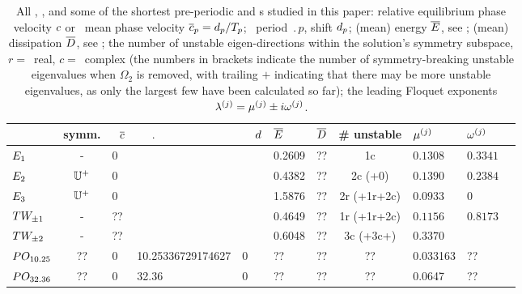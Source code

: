 \documentclass[aip,cha,showpacs,reprint]{revtex4-1} %
\begin{document}
\begin{table*}
   \caption{\label{tab:RPOs}
      All \eqva, \reqva, and some of the shortest pre-periodic and \rpo s
      studied in this paper:
      rela\-ti\-ve equilib\-rium phase velocity $c$ or \rpo\ mean
      phase velocity $\overline{c}_p= d_p/{T_{p}}$;
      \rpo\ period $\period{p}$, shift $d_p$;
      (mean) energy $\overline{E}$, see ;
      (mean) dissipation $\overline{D}$, see ;
      the number of unstable eigen-directions within the solution's
      symmetry subspace, $r= $~real, $c= $~complex (the numbers in
      brackets indicate the number of symmetry-breaking unstable
      eigenvalues when $\Omega_2$ is removed, with trailing $+$
      indicating that there may be more unstable eigenvalues, as only the
      largest few have been calculated so far);
      the leading  Floquet exponents
      $\eigExp[j]= \eigRe[j] \pm i\eigIm[j]$.
   }
   \centering
   \begin{tabular}{lclllllclll}
       & symm.           & $~~\overline{c}$
                                   & ~~$\period{}$ &  ~~$d$
                                   & $\overline{E}$~~  & $\overline{D}$
                                   & \# unstable
                                   & $\eigRe[j]$ & $\eigIm[j]$
                                   \\
   \hline
   $E_{1}$ & - & 0 &&& 0.2609 & ??  & 1c  & $0.1308$& $0.3341$ \\
   $E_{2}$ & $\mathbb{U}^+$ & 0 &&& 0.4382 & ?? & 2c (+0) & $0.1390$& $0.2384$ \\ %
   $E_{3}$ & $\mathbb{U}^+$ & 0 &&& 1.5876 & ?? & 2r (+1r+2c) & $0.0933$& 0 \\ %
   $TW_{\pm1}$ & - & ?? &&& 0.4649 & ?? & 1r (+1r+2c) & $0.1156$ & $0.8173$ \\ %
   $TW_{\pm2}$ & - & ?? &&& 0.6048 & ?? & 3c (+3c+) & $0.3370$ &         \\ %
   $PO_{10.25}$  & ?? & $0$ & 10.25336729174627 & 0 & ?? & ?? & ?? & 0.033163 & ?? \\
   $PO_{32.36}$  & ?? & $0$ & 32.36 & 0 & ?? & ?? & ?? & 0.0647 & ?? \\

\end{tabular}
\end{table*}
\end{document}
